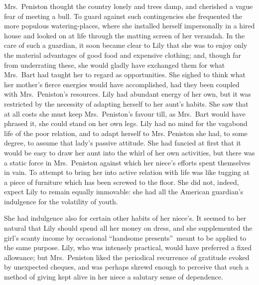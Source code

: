 \documentclass[12pt,a4paper]{book}
\begin{document}
Mrs.\ Peniston thought the country lonely and trees damp, and
cherished a vague fear of meeting a bull. To guard against such
contingencies she frequented the more populous watering-places,
where she installed herself impersonally in a hired house and
looked on at life through the matting screen of her verandah. In
the care of such a guardian, it soon became clear to Lily that
she was to enjoy only the material advantages of good food and
expensive clothing; and, though far from underrating these, she
would gladly have exchanged them for what Mrs.\ Bart had taught
her to regard as opportunities. She sighed to think what her
mother's fierce energies would have accomplished, had they been
coupled with Mrs.\ Peniston's resources. Lily had abundant energy
of her own, but it was restricted by the necessity of adapting
herself to her aunt's habits. She saw that at all costs she must
keep Mrs.\ Peniston's favour till, as Mrs.\ Bart would have phrased
it, she could stand on her own legs. Lily had no mind for the
vagabond life of the poor relation, and to adapt herself to Mrs.
Peniston she had, to some degree, to assume that lady's passive
attitude. She had fancied at first that it would be easy to draw
her aunt into the whirl of her own activities, but there was a
static force in Mrs.\ Peniston against which her niece's efforts
spent themselves in vain. To attempt to bring her into active
relation with life was like tugging at a piece of furniture which
has been screwed to the floor. She did not, indeed, expect Lily
to remain equally immovable: she had all the American guardian's
indulgence for the volatility of youth.





She had indulgence also for certain other habits of her niece's. 
It seemed to her natural that Lily should spend all her money on
dress, and she supplemented the girl's scanty income by
occasional ``handsome presents''\ meant to be applied to the same
purpose. Lily, who was intensely practical, would have preferred
a fixed allowance; but Mrs.\ Peniston liked the periodical
recurrence of gratitude evoked by unexpected cheques, and was
perhaps shrewd enough to perceive that such a method of giving
kept alive in her niece a salutary sense of dependence.
\end{document}
